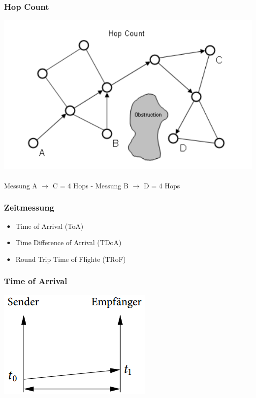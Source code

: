 \begin{frame}
  \frametitle{Hop Count}

  \begin{center}
  \includegraphics[scale=0.5]{img/hop_count1}
  \\~\\
  Messung A $\to$ C = 4 Hops - Messung B $\to$ D = 4 Hops
  \end{center}
\end{frame}

\begin{frame}
\frametitle{Zeitmessung}

\begin{itemize}
  \item Time of Arrival (ToA)
  \item Time Difference of Arrival (TDoA)
  \item Round Trip Time of Flighte (TRoF)
\end{itemize}
\end{frame}

\begin{frame}
\frametitle{Time of Arrival}
  \begin{center}
    \includegraphics[scale=0.5]{img/time1.png}
  \end{center}
\end{frame}

